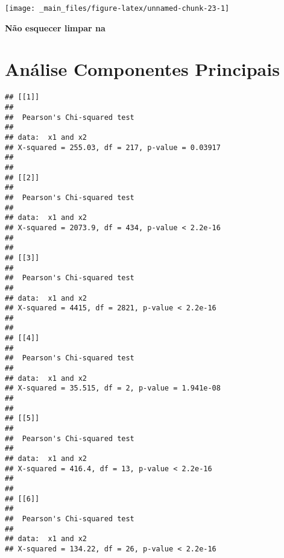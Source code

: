 \documentclass[
]{article}
\begin{document}
\begin{center}\texttt{[image: \_main\_files/figure-latex/unnamed-chunk-23-1]} \end{center}

\textbf{Não esquecer limpar na}

\newpage

\hypertarget{anuxe1lise-componentes-principais}{%
\section{Análise Componentes Principais}\label{anuxe1lise-componentes-principais}}

\begin{verbatim}
## [[1]]
## 
##  Pearson's Chi-squared test
## 
## data:  x1 and x2
## X-squared = 255.03, df = 217, p-value = 0.03917
## 
## 
## [[2]]
## 
##  Pearson's Chi-squared test
## 
## data:  x1 and x2
## X-squared = 2073.9, df = 434, p-value < 2.2e-16
## 
## 
## [[3]]
## 
##  Pearson's Chi-squared test
## 
## data:  x1 and x2
## X-squared = 4415, df = 2821, p-value < 2.2e-16
## 
## 
## [[4]]
## 
##  Pearson's Chi-squared test
## 
## data:  x1 and x2
## X-squared = 35.515, df = 2, p-value = 1.941e-08
## 
## 
## [[5]]
## 
##  Pearson's Chi-squared test
## 
## data:  x1 and x2
## X-squared = 416.4, df = 13, p-value < 2.2e-16
## 
## 
## [[6]]
## 
##  Pearson's Chi-squared test
## 
## data:  x1 and x2
## X-squared = 134.22, df = 26, p-value < 2.2e-16
\end{verbatim}
\end{document}
